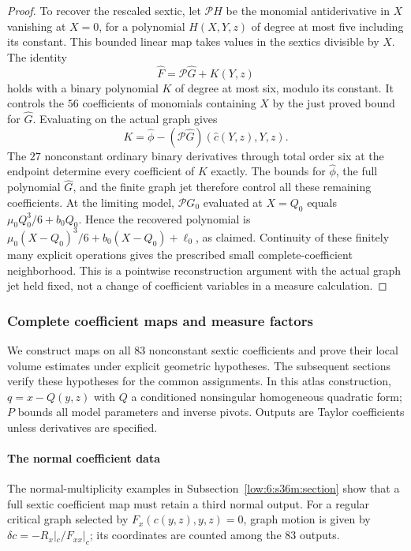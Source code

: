 \documentclass[11pt]{amsart}
\theoremstyle{definition}
\theoremstyle{remark}
\numberwithin{equation}{section}
\begin{document}
\begin{proof}
To recover the rescaled sextic, let $\mathcal P H$ be the monomial antiderivative in $X$ vanishing at $X=0$, for a polynomial $H(X,Y,z)$ of degree at most five including its constant. This bounded linear map takes values in the sextics divisible by $X$. The identity
\[
\widehat F=\mathcal P\widehat G+K(Y,z)
\]
holds with a binary polynomial $K$ of degree at most six, modulo its constant. It controls the $56$ coefficients of monomials containing $X$ by the just proved bound for $\widehat G$. Evaluating on the actual graph gives
\[
K=\widehat\phi-(\mathcal P\widehat G)(\widehat c(Y,z),Y,z).
\]
The $27$ nonconstant ordinary binary derivatives through total order six at the endpoint determine every coefficient of $K$ exactly. The bounds for $\widehat\phi$, the full polynomial $\widehat G$, and the finite graph jet therefore control all these remaining coefficients. At the limiting model, $\mathcal P G_0$ evaluated at $X=Q_0$ equals $\mu_0Q_0^3/6+b_0Q_0$. Hence the recovered polynomial is $\mu_0(X-Q_0)^3/6+b_0(X-Q_0)+\ell_0$, as claimed. Continuity of these finitely many explicit operations gives the prescribed small complete-coefficient neighborhood. This is a pointwise reconstruction argument with the actual graph jet held fixed, not a change of coefficient variables in a measure calculation.
\end{proof}

\subsubsection{Complete coefficient maps and measure factors}
We construct maps on all $83$ nonconstant sextic coefficients and prove their local volume estimates under explicit geometric hypotheses. The subsequent sections verify these hypotheses for the common assignments. In this atlas construction, $q=x-Q(y,z)$ with $Q$ a conditioned nonsingular homogeneous quadratic form; $P$ bounds all model parameters and inverse pivots. Outputs are Taylor coefficients unless derivatives are specified.

\paragraph{The normal coefficient data}
The normal-multiplicity examples in Subsection~\ref{low:6:s36m:section} show that a full sextic coefficient map must retain a third normal output. For a regular critical graph selected by $F_x(c(y,z),y,z)=0$, graph motion is given by $\delta c=-R_x|_c/F_{xx}|_c$; its coordinates are counted among the $83$ outputs.
\end{document}
